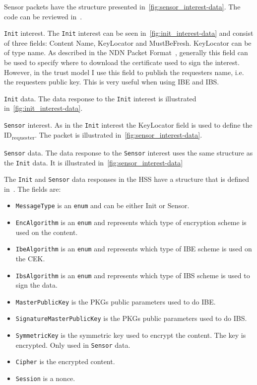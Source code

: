 Sensor packets have the structure presented in~\autoref{fig:sensor_interest-data}.
The code can be reviewed in~\cite[messageBuf.proto]{garseg15}.

\texttt{Init} \gls{interest}. 
The \texttt{Init} \gls{interest} can be seen in~\autoref{fig:init_interest-data} and consist of three fields: Content Name, KeyLocator and MustBeFresh.
KeyLocator can be of type \gls{name}. 
As described in the \gls{NDN} Packet Format~\cite{ndnpacketformat}, generally this field can be used to specify where to download the certificate used to sign the \gls{interest}.
However, in the trust model I use this field to publish the requesters \gls{name}, i.e. the requesters public key. 
This is very useful when using \gls{IBE} and \gls{IBS}.

\texttt{Init} \gls{data}.
The \gls{data} response to the \texttt{Init} \gls{interest} is illustrated in~\autoref{fig:init_interest-data}.
	
\texttt{Sensor} \gls{interest}.
As in the \texttt{Init} \gls{interest} the KeyLocator field is used to define the ID\textsubscript{requester}. 
The packet is illustrated in~\autoref{fig:sensor_interest-data}.
	
\texttt{Sensor} \gls{data}.
The \gls{data} response to the \texttt{Sensor} \gls{interest} uses the same structure as the \texttt{Init} \gls{data}. 
It is illustrated in~\autoref{fig:sensor_interest-data}

The \texttt{Init} and \texttt{Sensor} \gls{data} responses in the \gls{HSS} have a structure that is defined in~\cite[messageBuf.proto]{garseg15}.
The fields are:
\begin{itemize}
  \item \texttt{MessageType} is an \texttt{enum} and can be either Init or Sensor.
  \item \texttt{EncAlgorithm} is an \texttt{enum} and represents which type of encryption scheme is used on the content.
  \item \texttt{IbeAlgorithm} is an \texttt{enum} and represents which type of \gls{IBE} scheme is used on the \gls{CEK}.
  \item \texttt{IbsAlgorithm} is an \texttt{enum} and represents which type of \gls{IBS} scheme is used to sign the \gls{data}.
  \item \texttt{MasterPublicKey} is the \gls{PKG}s public parameters used to do \gls{IBE}.
  \item \texttt{SignatureMasterPublicKey} is the \gls{PKG}s public parameters used to do \gls{IBS}.
  \item \texttt{SymmetricKey} is the symmetric key used to encrypt the content. The key is encrypted. Only used in \texttt{Sensor} \gls{data}.
  \item \texttt{Cipher} is the encrypted content.
  \item \texttt{Session} is a nonce.
\end{itemize}

